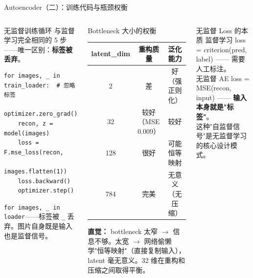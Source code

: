 \documentclass[aspectratio=169]{ctexbeamer}
\begin{document}
\begin{frame}[fragile,shrink=10]{Autoencoder（二）：训练代码与瓶颈权衡}
\small

\begin{columns}[T]
\begin{block}{无监督训练循环}
\footnotesize
与监督学习完全相同的 5 步——唯一区别：\textbf{标签被丢弃}。

\begin{lstlisting}[basicstyle=\ttfamily\scriptsize, frame=none, numbers=none, backgroundcolor=\color{codebg}]
for images, _ in train_loader:  # 忽略标签
    optimizer.zero_grad()
    recon, z = model(images)
    loss = F.mse_loss(recon,
             images.flatten(1))
    loss.backward()
    optimizer.step()
\end{lstlisting}
\vspace{-0.1cm}
\texttt{for images, \_ in loader}——标签被 \texttt{\_} 丢弃。图片自身既是输入也是监督信号。
\end{block}

\begin{block}{Bottleneck 大小的权衡}
\footnotesize
\centering
\begin{tabular}{c c c}
\toprule
\textbf{latent\_dim} & \textbf{重构质量} & \textbf{泛化能力} \\
\midrule
2  & 差 & 好（强正则化） \\
32 & 较好（MSE 0.009） & 较好 \\
128 & 很好 & 可能恒等映射 \\
784 & 完美 & 无意义（无压缩） \\
\bottomrule
\end{tabular}
\vspace{0.1cm}

\textbf{直觉：} bottleneck 太窄 $\to$ 信息不够。太宽 $\to$ 网络偷懒学"恒等映射"（直接复制输入），latent 毫无意义。32 维在重构和压缩之间取得平衡。
\end{block}

\vspace{0.1cm}

\begin{exampleblock}{无监督 Loss 的本质}
\footnotesize
监督学习 loss = criterion(pred, label) —— 需要人工标注。\\
无监督 AE loss = MSE(recon, input) —— \textbf{输入本身就是"标签"}。\\
这种"自监督信号"是无监督学习的核心设计模式。
\end{exampleblock}
\end{columns}
\end{frame}
\end{document}
